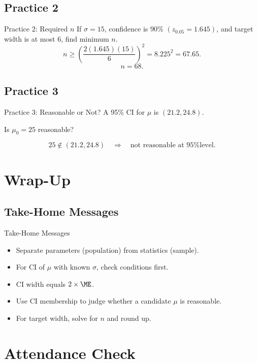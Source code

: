 \documentclass[aspectratio=169]{beamer}
\begin{document}
\subsection{Practice 2}
\begin{frame}{Practice 2: Required \(n\)}
  If \(\sigma=15\), confidence is 90\% \((z_{0.05}=1.645)\),
  and target width is at most \(6\), find minimum \(n\).
  \pause
  \[
    n\ge\left(\frac{2(1.645)(15)}{6}\right)^2
    =8.225^2
    =67.65.
  \]
  \[
    n=68.
  \]
\end{frame}

\subsection{Practice 3}
\begin{frame}{Practice 3: Reasonable or Not?}
  A 95\% CI for \(\mu\) is \((21.2,24.8)\).

  Is \(\mu_0=25\) reasonable?
  \pause

  \[
    25\notin(21.2,24.8)
    \quad\Rightarrow\quad
    \text{not reasonable at 95\% level.}
  \]
\end{frame}

\section{Wrap-Up}

\subsection{Take-Home Messages}
\begin{frame}{Take-Home Messages}
  \begin{itemize}
    \item Separate parameters (population) from statistics (sample).
    \item For CI of \(\mu\) with known \(\sigma\), check conditions first.
    \item CI width equals \(2\times\ME\).
    \item Use CI membership to judge whether a candidate \(\mu\) is reasonable.
    \item For target width, solve for \(n\) and round up.
  \end{itemize}
\end{frame}

\section{Attendance Check}
\end{document}
